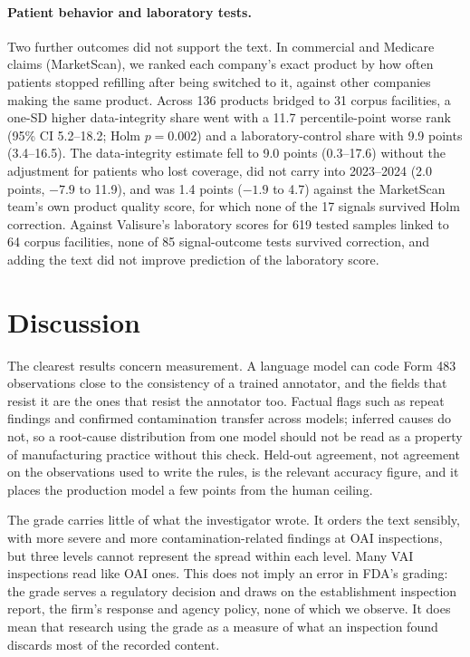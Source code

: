 \documentclass[12pt]{article}
\begin{document}
\paragraph{Patient behavior and laboratory tests.} Two further outcomes did
not support the text. In commercial and Medicare claims (MarketScan), we
ranked each company's exact product by how often patients stopped refilling
after being switched to it, against other companies making the same
product. Across 136 products bridged to 31 corpus facilities, a one-SD
higher data-integrity share went with a 11.7 percentile-point worse rank
(95\% CI 5.2--18.2; Holm $p=0.002$) and a laboratory-control share with
9.9 points (3.4--16.5). The data-integrity estimate fell to 9.0 points
(0.3--17.6) without the adjustment for patients who lost coverage, did not
carry into 2023--2024 (2.0 points, $-7.9$ to 11.9), and was 1.4 points
($-1.9$ to 4.7) against the MarketScan team's own product quality score,
for which none of the 17 signals survived Holm correction. Against
Valisure's laboratory scores for 619 tested samples linked to 64 corpus
facilities, none of 85 signal-outcome tests survived correction, and adding
the text did not improve prediction of the laboratory score.

\section{Discussion}
\label{sec:discussion}

The clearest results concern measurement. A language model can code Form
483 observations close to the consistency of a trained annotator, and the
fields that resist it are the ones that resist the annotator too. Factual
flags such as repeat findings and confirmed contamination transfer across
models; inferred causes do not, so a root-cause distribution from one
model should not be read as a property of manufacturing practice without
this check. Held-out agreement, not agreement on the observations used to
write the rules, is the relevant accuracy figure, and it places the
production model a few points from the human ceiling.

The grade carries little of what the investigator wrote. It orders the
text sensibly, with more severe and more contamination-related findings at
OAI inspections, but three levels cannot represent the spread within each
level. Many VAI inspections read like OAI ones. This does not imply an
error in FDA's grading: the grade serves a regulatory decision and draws on
the establishment inspection report, the firm's response and agency
policy, none of which we observe. It does mean that research using the
grade as a measure of what an inspection found discards most of the
recorded content.
\end{document}
